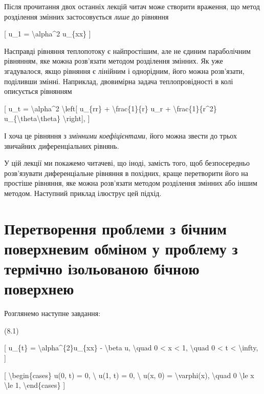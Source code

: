 \documentclass[
]{article}
\begin{document}
Після прочитання двох останніх лекцій читач може створити враження, що
метод розділення змінних застосовується \emph{лише} до рівняння

{[} u\_1 = \textbackslash alpha\^{}2 u\_\{xx\} {]}

Насправді рівняння теплопотоку є найпростішим, але не єдиним
параболічним рівнянням, яке можна розв'язати методом розділення змінних.
Як уже згадувалося, якщо рівняння є лінійним і однорідним, його можна
розв'язати, поділивши змінні. Наприклад, двовимірна задача
теплопровідності в колі описується рівнянням

{[} u\_t = \textbackslash alpha\^{}2 \textbackslash left{[} u\_\{rr\} +
\textbackslash frac\{1\}\{r\} u\_r + \textbackslash frac\{1\}\{r\^{}2\}
u\_\{\textbackslash theta\textbackslash theta\} \textbackslash right{]},
{]}

І хоча це рівняння з \emph{змінними коефіцієнтами}, його можна звести до
трьох звичайних диференціальних рівнянь.

У цій лекції ми покажемо читачеві, що іноді, замість того, щоб
безпосередньо розв'язувати диференціальне рівняння в похідних, краще
перетворити його на простіше рівняння, яке можна розв'язати методом
розділення змінних або іншим методом. Наступний приклад ілюструє цей
підхід.

\section{Перетворення проблеми з бічним поверхневим обміном у проблему з
термічно ізольованою бічною
поверхнею}\label{ux43fux435ux440ux435ux442ux432ux43eux440ux435ux43dux43dux44f-ux43fux440ux43eux431ux43bux435ux43cux438-ux437-ux431ux456ux447ux43dux438ux43c-ux43fux43eux432ux435ux440ux445ux43dux435ux432ux438ux43c-ux43eux431ux43cux456ux43dux43eux43c-ux443-ux43fux440ux43eux431ux43bux435ux43cux443-ux437-ux442ux435ux440ux43cux456ux447ux43dux43e-ux456ux437ux43eux43bux44cux43eux432ux430ux43dux43eux44e-ux431ux456ux447ux43dux43eux44e-ux43fux43eux432ux435ux440ux445ux43dux435ux44e}

Розглянемо наступне завдання:

(8.1)

{[} u\_\{t\} = \textbackslash alpha\^{}\{2\}u\_\{xx\} -
\textbackslash beta u, \textbackslash quad 0 \textless{} x \textless{}
1, \textbackslash quad 0 \textless{} t \textless{} \textbackslash infty,
{]}

{[} \textbackslash begin\{cases\} u(0, t) = 0, \textbackslash{} u(1, t)
= 0, \textbackslash{} u(x, 0) = \textbackslash varphi(x),
\textbackslash quad 0 \textbackslash le x \textbackslash le 1,
\textbackslash end\{cases\} {]}
\end{document}
